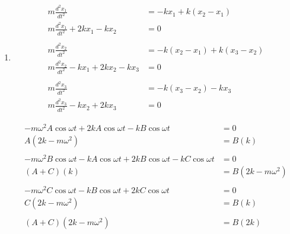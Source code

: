 \documentclass{article}
\begin{document}
\begin{enumerate}
  \item

        \begin{align*}
          m \frac{d^2 x_1}{d t^2}                           & = -k x_1 + k (x_2 - x_1)         \\
          m \frac{d^2 x_1}{d t^2} + 2 k x_1 - k x_2         & = 0                              \\ \\
          m \frac{d^2 x_2}{d t^2}                           & = -k (x_2 - x_1) + k (x_3 - x_2) \\
          m \frac{d^2 x_2}{d t^2} - k x_1 + 2 k x_2 - k x_3 & = 0                              \\ \\
          m \frac{d^2 x_3}{d t^2}                           & = -k (x_3 - x_2) - k x_3         \\
          m \frac{d^2 x_3}{d t^2} - k x_2 + 2 k x_3         & = 0
        \end{align*}

        \begin{align*}
          -m \omega^2 A \cos \omega t + 2 k A \cos \omega t - k B \cos \omega t                     & = 0                    \\
          A (2k - m \omega^2)                                                                       & = B (k)                \\ \\
          -m \omega^2 B \cos \omega t - k A \cos \omega t + 2 k B \cos \omega t - k C \cos \omega t & = 0                    \\
          (A + C) (k)                                                                               & = B (2 k - m \omega^2) \\ \\
          -m \omega^2 C \cos \omega t - k B \cos \omega t + 2 k C \cos \omega t                     & = 0                    \\
          C (2 k - m \omega^2)                                                                      & = B (k)                \\ \\
          (A + C) (2 k - m \omega^2)                                                                & = B (2 k)
        \end{align*}


\end{enumerate}
\end{document}
